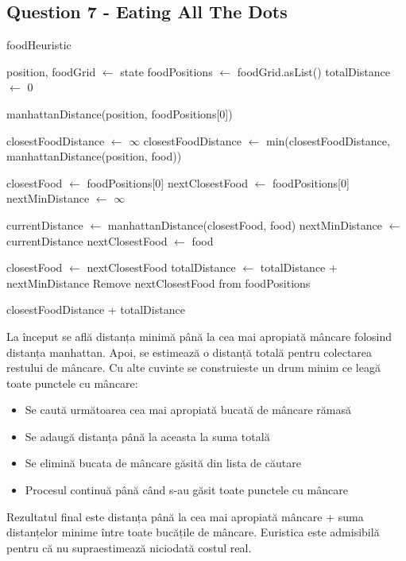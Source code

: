 \pagebreak

\subsection {Question 7 - Eating All The Dots}

\begin{algorithm}
\caption{foodHeuristic}
\begin{algorithmic}[1]
    \State position, foodGrid $\gets$ state
    \State foodPositions $\gets$ foodGrid.asList()
    \State totalDistance $\gets$ 0
    
        \State {}
    \EndIf
    
        \State \Return manhattanDistance(position, foodPositions[0])
    \EndIf
    
    \State closestFoodDistance $\gets$ $\infty$
        \State closestFoodDistance $\gets$ min(closestFoodDistance, manhattanDistance(position, food))
    \EndFor
    
    \State closestFood $\gets$ foodPositions[0]
        \State nextClosestFood $\gets$ foodPositions[0]
        \State nextMinDistance $\gets$ $\infty$
        
            \State currentDistance $\gets$ manhattanDistance(closestFood, food)
                \State nextMinDistance $\gets$ currentDistance
                \State nextClosestFood $\gets$ food
            \EndIf
        \EndFor
        
        \State closestFood $\gets$ nextClosestFood
        \State totalDistance $\gets$ totalDistance + nextMinDistance
        \State Remove nextClosestFood from foodPositions
    \EndWhile
    
    \State \Return closestFoodDistance + totalDistance
\EndFunction
\end{algorithmic}
\end{algorithm}

\par La început se află distanța minimă până la cea mai apropiată mâncare folosind distanța manhattan. Apoi, se estimează o distanță totală pentru colectarea restului de mâncare. Cu alte cuvinte se construieste un drum minim ce leagă toate punctele cu mâncare: 
\begin{itemize}
	\item Se caută următoarea cea mai apropiată bucată de mâncare rămasă
	\item Se adaugă distanța până la aceasta la suma totală
	\item Se elimină bucata de mâncare găsită din lista de căutare
	\item Procesul continuă până când s-au găsit toate punctele cu mâncare
\end{itemize}
\par Rezultatul final este distanța până la cea mai apropiată mâncare + suma distanțelor minime între toate bucățile de mâncare. Euristica este admisibilă pentru că nu supraestimează niciodată costul real.

